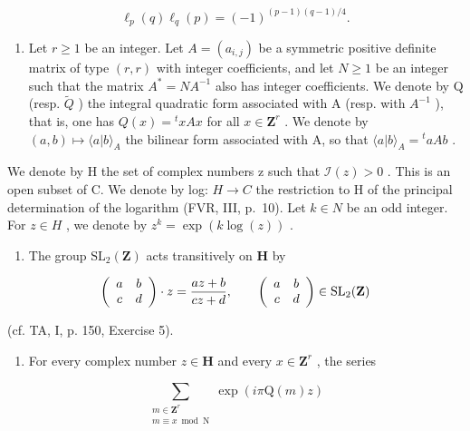 \[
\ell_ {p} (q) \ell_ {q} (p) = (- 1) ^ {(p - 1) (q - 1) / 4}.
\]

\begin{enumerate}
\def\labelenumi{\arabic{enumi})}
\setcounter{enumi}{60}
\tightlist
\item
  Let \(r \geqslant 1\) be an integer. Let \(A = (a_{i,j})\) be a symmetric positive definite matrix of type \((r, r)\) with integer coefficients, and let \(N \geqslant 1\) be an integer such that the matrix \(A^* = NA^{-1}\) also has integer coefficients. We denote by Q (resp. \(\widetilde{Q}\) ) the integral quadratic form associated with A (resp. with \(A^{-1}\) ), that is, one has \(Q(x) = {}^t xAx\) for all \(x \in \mathbf{Z}^r\) . We denote by \((a, b) \mapsto \langle a|b \rangle_A\) the bilinear form associated with A, so that \(\langle a|b \rangle_A = {}^t aAb\) .
\end{enumerate}

We denote by H the set of complex numbers z such that \(\mathcal{I}(z)>0\) . This is an open subset of C. We denote by log: \(H\to C\) the restriction to H of the principal determination of the logarithm (FVR, III, p.~10). Let \(k\in N\) be an odd integer. For \(z\in H\) , we denote by \(z^{k}=\exp(k\log(z))\) .

\begin{enumerate}
\def\labelenumi{\alph{enumi})}
\tightlist
\item
  The group \(\mathrm{SL}_2(\mathbf{Z})\) acts transitively on \(\mathbf{H}\) by
\end{enumerate}

\[
\left( \begin{array}{c c} a & b \\ c & d \end{array} \right) \cdot z = \frac {a z + b}{c z + d}, \qquad \left( \begin{array}{c c} a & b \\ c & d \end{array} \right) \in \mathrm{SL} _ {2} (\mathbf {Z})
\]

  (cf. TA, I, p. 150, Exercise 5).

\begin{enumerate}
\def\labelenumi{\alph{enumi})}
\setcounter{enumi}{1}
\tightlist
\item
  For every complex number \(z \in \mathbf{H}\) and every \(x \in \mathbf{Z}^r\) , the series
\end{enumerate}

\[
\sum_{\substack{m\in \mathbf{Z}^{r}\\ m\equiv x\bmod \mathrm{N}}}\exp (i\pi \mathrm{Q}(m)z)
\]

